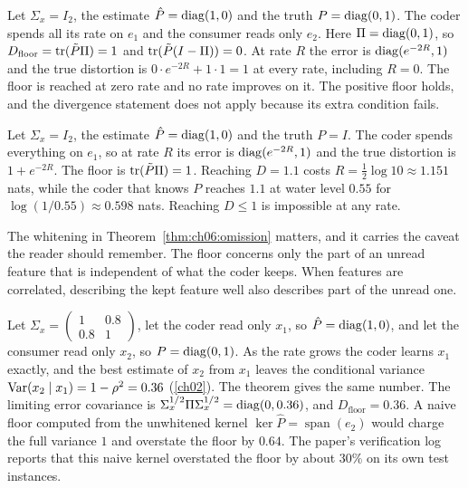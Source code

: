 \begin{example}\label{ex:ch06:disjoint}
Let $\Sigma_x=I_2$, the estimate $\hat P=\operatorname{diag}(1,0)$ and the truth $P=\operatorname{diag}(0,1)$. The coder spends all its rate on $e_1$ and the consumer reads only $e_2$. Here $\Pi=\operatorname{diag}(0,1)$, so $D_{\mathrm{floor}}=\operatorname{tr}(\tilde P\Pi)=1$ and $\operatorname{tr}(\tilde P(I-\Pi))=0$. At rate $R$ the error is $\operatorname{diag}(e^{-2R},1)$ and the true distortion is $0\cdot e^{-2R}+1\cdot1=1$ at every rate, including $R=0$. The floor is reached at zero rate and no rate improves on it. The positive floor holds, and the divergence statement does not apply because its extra condition fails.
\end{example}

\begin{example}\label{ex:ch06:omission}
Let $\Sigma_x=I_2$, the estimate $\hat P=\operatorname{diag}(1,0)$ and the truth $P=I$. The coder spends everything on $e_1$, so at rate $R$ its error is $\operatorname{diag}(e^{-2R},1)$ and the true distortion is $1+e^{-2R}$. The floor is $\operatorname{tr}(\tilde P\Pi)=1$. Reaching $D=1.1$ costs $R=\tfrac12\log10\approx1.151$ nats, while the coder that knows $P$ reaches $1.1$ at water level $0.55$ for $\log(1/0.55)\approx0.598$ nats. Reaching $D\le1$ is impossible at any rate.
\end{example}

The whitening in Theorem~\ref{thm:ch06:omission} matters, and it carries the caveat the reader should remember. The floor concerns only the part of an unread feature that is independent of what the coder keeps. When features are correlated, describing the kept feature well also describes part of the unread one.

\begin{example}\label{ex:ch06:corr}
Let $\Sigma_x=\begin{pmatrix}1&0.8\\0.8&1\end{pmatrix}$, let the coder read only $x_1$, so $\hat P=\operatorname{diag}(1,0)$, and let the consumer read only $x_2$, so $P=\operatorname{diag}(0,1)$. As the rate grows the coder learns $x_1$ exactly, and the best estimate of $x_2$ from $x_1$ leaves the conditional variance $\operatorname{Var}(x_2\mid x_1)=1-\rho^2=0.36$ (\cref{ch02}). The theorem gives the same number. The limiting error covariance is $\Sigma_x^{1/2}\Pi\Sigma_x^{1/2}=\operatorname{diag}(0,0.36)$, and $D_{\mathrm{floor}}=0.36$. A naive floor computed from the unwhitened kernel $\ker\hat P=\operatorname{span}(e_2)$ would charge the full variance $1$ and overstate the floor by $0.64$. The paper's verification log reports that this naive kernel overstated the floor by about $30\%$ on its own test instances.
\end{example}

